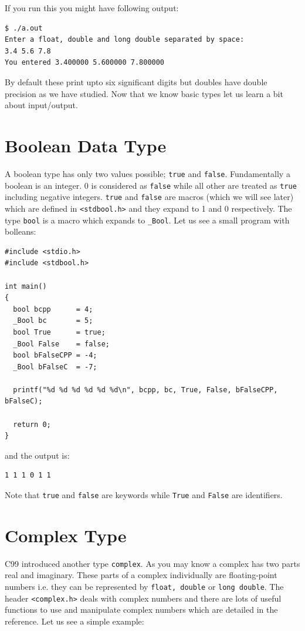 If you run this you might have following output:

\begin{Verbatim}[frame=single]
$ ./a.out
Enter a float, double and long double separated by space:
3.4 5.6 7.8
You entered 3.400000 5.600000 7.800000
\end{Verbatim}

By default these print upto six significant digits but doubles have double
precision as we have studied. Now that we know basic types let us learn a bit
about input/output.

\section{Boolean Data Type}
A boolean type has only two values possible; \texttt{true} and
\texttt{false}. Fundamentally a boolean is an integer. 0 is considered as
\texttt{false} while all other are treated as \texttt{true} including negative
integers. \texttt{true} and \texttt{false} are macros (which we will see later)
which are defined in \texttt{<stdbool.h>} and they expand to 1 and 0
respectively. The type \texttt{bool} is a macro which expands to
\texttt{\_Bool}. Let us see a small program with bolleans:

\begin{Verbatim}[frame=single]
#include <stdio.h>
#include <stdbool.h>

int main()
{
  bool bcpp      = 4;
  _Bool bc       = 5;
  bool True      = true;
  _Bool False    = false;
  bool bFalseCPP = -4;
  _Bool bFalseC  = -7;

  printf("%d %d %d %d %d %d\n", bcpp, bc, True, False, bFalseCPP, bFalseC);

  return 0;
}
\end{Verbatim}

and the output is:

\begin{Verbatim}[frame=single]
1 1 1 0 1 1
\end{Verbatim}

Note that \texttt{true} and \texttt{false} are keywords while \texttt{True} and
\texttt{False} are identifiers.

\section{Complex Type}
C99 introduced another type \texttt{complex}. As you may know a complex has two
parts real and imaginary. These parts of a complex individually are
floating-point numbers i.e. they can be represented by \texttt{float, double}
or \texttt{long double}. The header \texttt{<complex.h>} deals with complex
numbers and there are lots of useful functions to use and manipulate complex
numbers which are detailed in the reference. Let us see a simple example:

